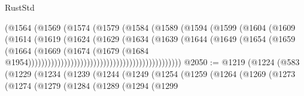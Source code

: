 \begin{lexlean}{RustStd}
\begin{coremodule}
                                                (@1564
                                                  (@1569
                                                    (@1574
                                                      (@1579
                                                        (@1584
                                                          (@1589
                                                            (@1594
                                                              (@1599
                                                                (@1604
                                                                  (@1609
                                                                    (@1614
                                                                      (@1619
                                                                        (@1624
                                                                          (@1629
                                                                            (@1634
                                                                              (@1639
                                                                                (@1644
                                                                                  (@1649
                                                                                    (@1654
                                                                                      (@1659
                                                                                        (@1664
                                                                                          (@1669
                                                                                            (@1674
                                                                                              (@1679
                                                                                                (@1684
                                                                                                  @1954)))))))))))))))))))))))))))))))))))))))))))))))
@2050 := @1219
    (@1224
      (@583
        (@1229
          (@1234
            (@1239
              (@1244
                (@1249
                  (@1254
                    (@1259
                      (@1264
                        (@1269
                          (@1273
                            (@1274
                              (@1279
                                (@1284
                                  (@1289
                                    (@1294
                                      (@1299

\end{coremodule}
\end{lexlean}

